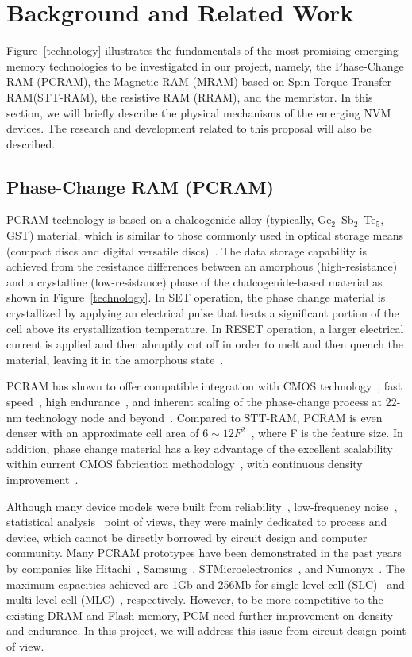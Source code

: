\section{Background and Related Work}

Figure~\ref{technology} illustrates the fundamentals of the most promising emerging memory technologies to be investigated in our project, namely, the Phase-Change RAM (PCRAM), the Magnetic RAM (MRAM) based on Spin-Torque Transfer RAM(STT-RAM), the resistive RAM (RRAM), and the memristor. In this section, we will briefly describe the physical mechanisms of the emerging NVM devices. The research and development related to this proposal will also be described.

\subsection{Phase-Change RAM (PCRAM)}
PCRAM technology is based on a chalcogenide alloy (typically, Ge$_2$--Sb$_2$--Te$_5$, GST) material, which is similar to those commonly used in optical storage means (compact discs and digital versatile discs)~\cite{Bedeschi09}. The data storage capability is achieved from the resistance differences between an amorphous (high-resistance) and a crystalline (low-resistance) phase of the chalcogenide-based material as shown in Figure~\ref{technology}. In SET operation, the phase change material is crystallized by applying an electrical pulse that heats a significant portion of the cell above its crystallization temperature. In RESET operation, a larger electrical current is applied and then abruptly cut off in order to melt and then quench the material, leaving it in the amorphous state~\cite{burr:scm08}.

PCRAM has shown to offer compatible integration with CMOS technology~\cite{Oh06}, fast speed~\cite{Pirovano03}, high endurance~\cite{Lai03}, and inherent scaling of the phase-change process at 22-nm technology node and beyond~\cite{Chen06}. Compared to STT-RAM, PCRAM is even denser with an approximate cell area of $6\sim12F^2$~\cite{ITRS07}, where F is the feature size. In addition, phase change material has a key advantage of the excellent scalability within current CMOS fabrication methodology~\cite{Cho05,Kim06,Lai01,Pirovano03,Raoux08}, with continuous density improvement~\cite{Nirschl07,Chen07-iedm,Im08}.

Although many device models were built from reliability~\cite{Ielmini07}, low-frequency noise~\cite{Fantini08}, statistical analysis~\cite{Mantegazza07} point of views, they were mainly dedicated to process and device, which cannot be directly borrowed by circuit design and computer community. Many PCRAM prototypes have been demonstrated in the past years by companies like Hitachi~\cite{Hanzawa07}, Samsung~\cite{Lee07-isscc}, STMicroelectronics~\cite{Bedeschi08, Sandre10}, and Numonyx~\cite{Villa10}. The maximum capacities achieved are 1Gb and 256Mb for single level cell (SLC)~\cite{Villa10} and multi-level cell (MLC)~\cite{Lee07-isscc}, respectively. However, to be more competitive to the existing DRAM and Flash memory, PCM need further improvement on density and endurance. In this project, we will address this issue from circuit design point of view.

